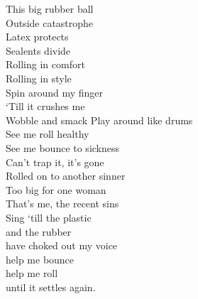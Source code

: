 This big rubber ball\\
Outside catastrophe\\
Latex protects\\
Sealents divide\\
Rolling in comfort\\
Rolling in style\\
Spin around my finger\\
`Till it crushes me\\
Wobble and smack
Play around like drums\\
See me roll healthy\\
See me bounce to sickness\\

Can't trap it, it's gone\\
Rolled on to another sinner\\
Too big for one woman\\
That's me, the recent sins\\
Sing `till the plastic\\
and the rubber\\
have choked out my voice\\
help me bounce\\
help me roll\\
until it settles again.\\

